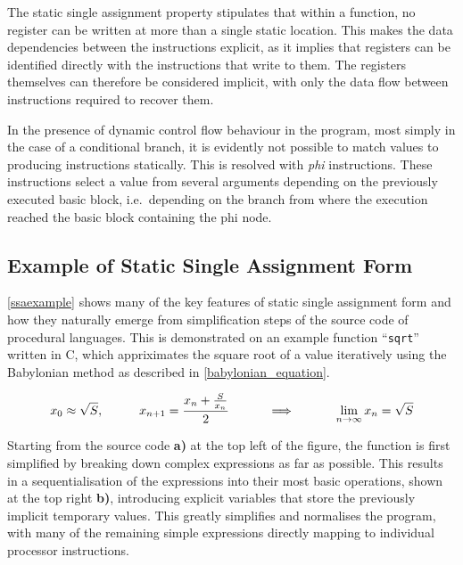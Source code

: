     The static single assignment property stipulates that within a function,
    no register can be written at more than a single static location.
    This makes the data dependencies between the instructions explicit, as it
    implies that registers can be identified directly with the instructions that
    write to them.
    The registers themselves can therefore be considered implicit, with only the
    data flow between instructions required to recover them.

    In the presence of dynamic control flow behaviour in the program, most
    simply in the case of a conditional branch, it is evidently not possible to
    match values to producing instructions statically.
    This is resolved with {\em phi} instructions.
    These instructions select a value from several arguments depending on the
    previously executed basic block, i.e.\ depending on the branch from where
    the execution reached the basic block containing the phi node.

\subsection{Example of Static Single Assignment Form}

    \autoref{ssaexample} shows many of the key features of static single
    assignment form and how they naturally emerge from simplification steps of
    the source code of procedural languages.
    This is demonstrated on an example function ``{\tt sqrt}'' written in C,
    which  appriximates the square root of a value iteratively using the
    Babylonian method as described in \autoref{babylonian_equation}.

\begin{equation}
    x_0\approx\sqrt{S},\text{\hspace{1cm}}
    x_{n+1}=\frac{x_n+\frac{S}{x_n}}{2}\text{\hspace{1cm}}
    \implies\text{\hspace{1cm}}
    \lim_{n\rightarrow\infty}x_n=\sqrt{S}
    \label{babylonian_equation}
\end{equation}

    Starting from the source code {\bf a)} at the top left of the figure, the
    function is first simplified by breaking down complex expressions as far as
    possible.
    This results in a sequentialisation of the expressions into their
    most basic operations, shown at the top right {\bf b)}, introducing
    explicit variables that store the previously implicit temporary values.
    This greatly simplifies and normalises the program, with many of the
    remaining simple expressions directly mapping to individual processor
    instructions.

